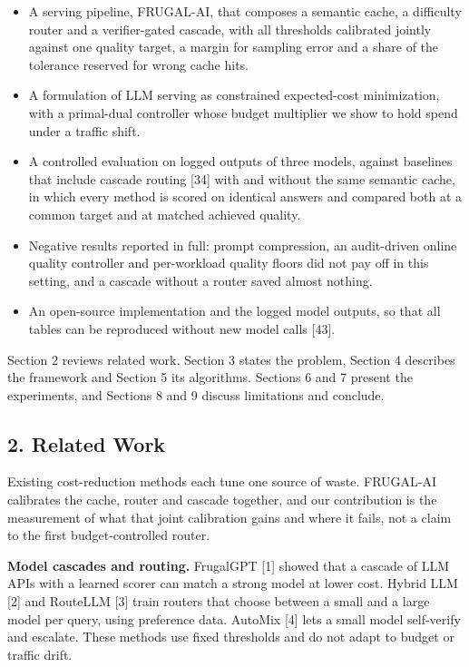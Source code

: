 \documentclass[
  10pt,
]{article}
\providecommand{\tightlist}{%
  \setlength{\itemsep}{0pt}\setlength{\parskip}{0pt}}
\begin{document}
\begin{itemize}
\tightlist
\item
  A serving pipeline, FRUGAL-AI, that composes a semantic cache, a
  difficulty router and a verifier-gated cascade, with all thresholds
  calibrated jointly against one quality target, a margin for sampling
  error and a share of the tolerance reserved for wrong cache hits.
\item
  A formulation of LLM serving as constrained expected-cost
  minimization, with a primal-dual controller whose budget multiplier we
  show to hold spend under a traffic shift.
\item
  A controlled evaluation on logged outputs of three models, against
  baselines that include cascade routing {[}34{]} with and without the
  same semantic cache, in which every method is scored on identical
  answers and compared both at a common target and at matched achieved
  quality.
\item
  Negative results reported in full: prompt compression, an audit-driven
  online quality controller and per-workload quality floors did not pay
  off in this setting, and a cascade without a router saved almost
  nothing.
\item
  An open-source implementation and the logged model outputs, so that
  all tables can be reproduced without new model calls {[}43{]}.
\end{itemize}

Section 2 reviews related work. Section 3 states the problem, Section 4
describes the framework and Section 5 its algorithms. Sections 6 and 7
present the experiments, and Sections 8 and 9 discuss limitations and
conclude.

\subsection{2. Related Work}\label{related-work}

Existing cost-reduction methods each tune one source of waste. FRUGAL-AI
calibrates the cache, router and cascade together, and our contribution
is the measurement of what that joint calibration gains and where it
fails, not a claim to the first budget-controlled router.

\textbf{Model cascades and routing.} FrugalGPT {[}1{]} showed that a
cascade of LLM APIs with a learned scorer can match a strong model at
lower cost. Hybrid LLM {[}2{]} and RouteLLM {[}3{]} train routers that
choose between a small and a large model per query, using preference
data. AutoMix {[}4{]} lets a small model self-verify and escalate. These
methods use fixed thresholds and do not adapt to budget or traffic
drift.
\end{document}
